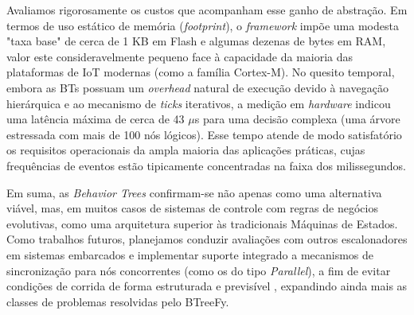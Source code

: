 \documentclass[conference]{IEEEtran}
\begin{document}
Avaliamos rigorosamente os custos que acompanham esse ganho de abstração. Em termos de uso estático de memória (\textit{footprint}), o \textit{framework} impõe uma modesta "taxa base" de cerca de 1 KB em Flash e algumas dezenas de bytes em RAM, valor este consideravelmente pequeno face à capacidade da maioria das plataformas de IoT modernas (como a família Cortex-M). No quesito temporal, embora as BTs possuam um \textit{overhead} natural de execução devido à navegação hierárquica e ao mecanismo de \textit{ticks} iterativos, a medição em \textit{hardware} indicou uma latência máxima de cerca de 43 $\mu$s para uma decisão complexa (uma árvore estressada com mais de 100 nós lógicos). Esse tempo atende de modo satisfatório os requisitos operacionais da ampla maioria das aplicações práticas, cujas frequências de eventos estão tipicamente concentradas na faixa dos milissegundos.

Em suma, as \textit{Behavior Trees} confirmam-se não apenas como uma alternativa viável, mas, em muitos casos de sistemas de controle com regras de negócios evolutivas, como uma arquitetura superior às tradicionais Máquinas de Estados. Como trabalhos futuros, planejamos conduzir avaliações com outros escalonadores em sistemas embarcados e implementar suporte integrado a mecanismos de sincronização para nós concorrentes (como os do tipo \textit{Parallel}), a fim de evitar condições de corrida de forma estruturada e previsível \cite{colledanchise_handling_2022}, expandindo ainda mais as classes de problemas resolvidas pelo BTreeFy.



\end{document}

